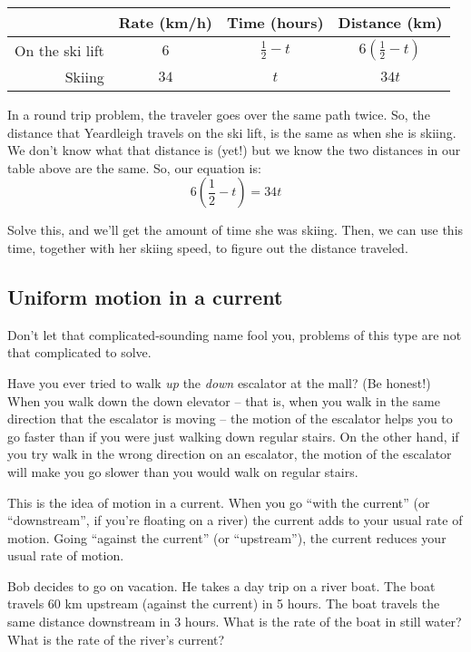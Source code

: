 \begin{center}
\begin{tabular}{r|ccc}
				& Rate (km/h)			& Time (hours)		& Distance (km)\\\hline
On the ski lift	& $6$					& $\frac{1}{2}-t$	& $6\left(\frac{1}{2}-t\right)$\\
Skiing			& $34$					& $t$				& $34t$\\
\end{tabular}
\end{center}

In a round trip problem, the traveler goes over the same path twice. So, the distance that Yeardleigh travels on the ski lift, is the same as when she is skiing. We don't know what that distance is (yet!) but we know the two distances in our table above are the same. So, our equation is:
\[
6\left(\frac{1}{2} - t\right) = 34t
\]

Solve this, and we'll get the amount of time she was skiing. Then, we can use this time, together with her skiing speed, to figure out the distance traveled.

\subsection*{Uniform motion in a current}

Don't let that complicated-sounding name fool you, problems of this type are not that complicated to solve.

Have you ever tried to walk \textit{up} the \textit{down} escalator at the mall? (Be honest!) When you walk down the down elevator -- that is, when you walk in the same direction that the escalator is moving -- the motion of the escalator helps you to go faster than if you were just walking down regular stairs. On the other hand, if you try walk in the wrong direction on an escalator, the motion of the escalator will make you go slower than you would walk on regular stairs.

This is the idea of motion in a current. When you go ``with the current'' (or ``downstream'', if you're floating on a river) the current adds to your usual rate of motion. Going ``against the current'' (or ``upstream''), the current reduces your usual rate of motion.

\begin{boxedex}
Bob decides to go on vacation. He takes a day trip on a river boat. The boat travels 60 km upstream (against the current) in 5 hours. The boat travels the same distance downstream in 3 hours. What is the rate of the boat in still water? What is the rate of the river's current?
\end{boxedex}

